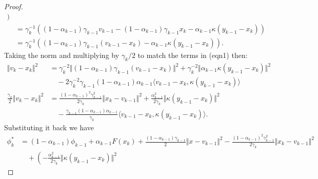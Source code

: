 \documentclass[12pt]{article}
\begin{document}
\begin{proof}
\begin{align*}
                )
                \\
                &= 
                \gamma_k^{-1}(
                    (1 - \alpha_{k - 1})\gamma_{k - 1}v_{k - 1}
                    - (1 - \alpha_{k - 1})\gamma_{k - 1} x_k - \alpha_{k - 1}\kappa(y_{k - 1} - x_k)
                )
                \\
                &= \gamma_k^{-1}(
                    (1 - \alpha_{k - 1})\gamma_{k - 1}(v_{k - 1} - x_k)
                    - \alpha_{k - 1}\kappa(y_{k - 1} - x_k)
                ).
            \end{align*}
            Taking the norm and multiplying by $\gamma_k/2$ to match the terms in (eqn1) then: 
            \begin{align*}
                \Vert v_k - x_k\Vert^2 &= 
                \gamma_k^{-2}\Vert (1 - \alpha_{k - 1})\gamma_{k - 1}(v_{k - 1} - x_k) \Vert^2
                + 
                \gamma_k^{-2}\Vert \alpha_{k - 1}\kappa(y_{k - 1} - x_k)\Vert^2
                \\
                & \quad 
                - 2\gamma_k^{-2}\gamma_{k - 1}(1 - \alpha_{k - 1})\alpha_{k - 1}\langle v_{k - 1} - x_k, \kappa(y_{k - 1} - x_k) \rangle
                \\
                \frac{\gamma_k}{2}
                \Vert v_k - x_k\Vert^2 
                &= 
                \frac{(1 - \alpha_{k - 1})^{2}\gamma_{k - 1}^{2}}{2\gamma_k}\Vert x_k - v_{k - 1}\Vert^2
                + 
                \frac{\alpha_{k - 1}^2}{2\gamma_k} \Vert \kappa(y_{k - 1} - x_k)\Vert^2
                \\
                &\quad 
                - 
                \frac{
                    \gamma_{k - 1}(1 - \alpha_{k - 1})\alpha_{k - 1}
                }{\gamma_k}\langle v_{k - 1} - x_k, \kappa(y_{k - 1} - x_k)\rangle.  
            \end{align*}
            Substituting it back we have 
            {\small
            \begin{align*}
                \phi_k^* &= 
                (1 - \alpha_{k - 1})\phi_{k - 1}+ \alpha_{k - 1}F(x_k)
                + 
                \frac{(1 - \alpha_{k - 1})\gamma_{k - 1}}{2}\Vert x - v_{k - 1}\Vert^2
                - 
                \frac{(1 - \alpha_{k - 1})^{2}\gamma_{k - 1}^{2}}{2\gamma_k}\Vert x_k - v_{k - 1}\Vert^2
                \\
                & \quad 
                    + \left(
                        - 
                        \frac{\alpha_{k - 1}^2}{2\gamma_k} \Vert \kappa(y_{k - 1} - x_k)\Vert^2

\end{align*}}
\end{proof}
\end{document}
